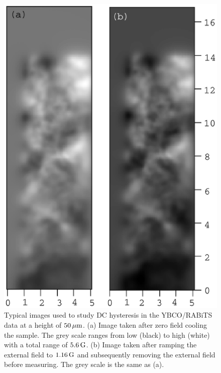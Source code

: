 %
%
\begin{figure}[p]
\includegraphics{figs/magpen/fig6a.ps}
\caption[DC hysteresis before and after images of YBCO/RABiTS.]
{Typical images used to study DC hysteresis in the YBCO/RABiTS data
at a height of $50\,\mu\mathrm{m}$.
(a) Image taken after zero field cooling the sample. The grey
scale ranges from low (black) to high (white) with a total
range of $5.6\,\mathrm{G}$. 
(b) Image taken after ramping the external field to $1.16\,\mathrm{G}$
and subsequently removing the external field before measuring. 
The grey scale is the same as (a). 
}
\label{fig:dc_hyst_gen_a}
\end{figure}

